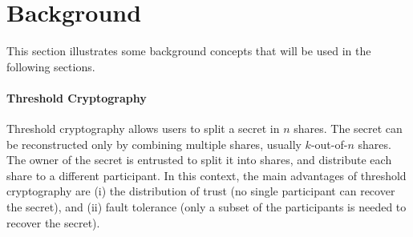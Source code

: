 \section{Background}\label{sect:background}

This section illustrates some background concepts that will be used in the following sections.


\begin{comment}
\begin{description}
	\item [Economic Constraints] Each party willing to keep a share of the secret until the disclosure time has the possibility to gain a remuneration paid by the time-lock creator. In order to prevent collusion among parties, that would result in premature secret disclosure, \copied{the protocol requires every participant to pay a security deposit so that any detected misbehavior can result in the deposit being confiscated.}
	We demonstrate that the best strategy of any rational party is to keep the share secret until the disclosure time, and then publish it --- effectively deploying the time-lock mechanism.
	\smallskip
\end{description}
\end{comment}


\paragraph{Threshold Cryptography}

Threshold cryptography allows users to split a secret in $n$ shares.
%
The secret can be reconstructed only by combining multiple shares, usually $k$-out-of-$n$ shares.
%
The owner of the secret is entrusted to split it into shares, and distribute each share to a different participant.
%
In this context, the main advantages of threshold cryptography are (i) the distribution of trust (no single participant can recover the secret), and (ii) fault tolerance (only a subset of the participants is needed to recover the secret).
%

